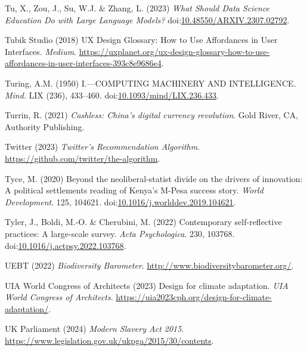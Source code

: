 \documentclass[
  letterpaper,
  DIV=11,
  numbers=noendperiod]{scrartcl}
\newlength{\cslhangindent}
\newenvironment{CSLReferences}[2] %
 {\begin{list}{}{%
  \setlength{\itemindent}{0pt}
  \setlength{\leftmargin}{0pt}
  \setlength{\parsep}{0pt}
  \ifodd #1
   \setlength{\leftmargin}{\cslhangindent}
   \setlength{\itemindent}{-1\cslhangindent}
  \fi
  \setlength{\itemsep}{#2\baselineskip}}}
 {\end{list}}
\begin{document}
\begin{CSLReferences}{0}{1}
Tu, X., Zou, J., Su, W.J. \& Zhang, L. (2023) \emph{What {Should Data
Science Education Do} with {Large Language Models}?}
doi:\href{https://doi.org/10.48550/ARXIV.2307.02792}{10.48550/ARXIV.2307.02792}.

Tubik Studio (2018) {UX Design Glossary}: {How} to {Use Affordances} in
{User Interfaces}. \emph{Medium}.
\url{https://uxplanet.org/ux-design-glossary-how-to-use-affordances-in-user-interfaces-393c8e9686e4}.

Turing, A.M. (1950) I.---{COMPUTING MACHINERY AND INTELLIGENCE}.
\emph{Mind}. LIX (236), 433--460.
doi:\href{https://doi.org/10.1093/mind/LIX.236.433}{10.1093/mind/LIX.236.433}.

Turrin, R. (2021) \emph{Cashless: {China}'s digital currency
revolution}. Gold River, CA, Authority Publishing.

Twitter (2023) \emph{Twitter's {Recommendation Algorithm}}.
\url{https://github.com/twitter/the-algorithm}.

Tyce, M. (2020) Beyond the neoliberal-statist divide on the drivers of
innovation: {A} political settlements reading of {Kenya}'s {M-Pesa}
success story. \emph{World Development}. 125, 104621.
doi:\href{https://doi.org/10.1016/j.worlddev.2019.104621}{10.1016/j.worlddev.2019.104621}.

Tyler, J., Boldi, M.-O. \& Cherubini, M. (2022) Contemporary
self-reflective practices: {A} large-scale survey. \emph{Acta
Psychologica}. 230, 103768.
doi:\href{https://doi.org/10.1016/j.actpsy.2022.103768}{10.1016/j.actpsy.2022.103768}.

UEBT (2022) \emph{Biodiversity {Barometer}}.
\url{http://www.biodiversitybarometer.org/}.

UIA World Congress of Architects (2023) Design for climate adaptation.
\emph{UIA World Congress of Architects}.
\url{https://uia2023cph.org/design-for-climate-adaptation/}.

UK Parliament (2024) \emph{Modern {Slavery Act} 2015}.
\url{https://www.legislation.gov.uk/ukpga/2015/30/contents}.


\end{CSLReferences}
\end{document}
